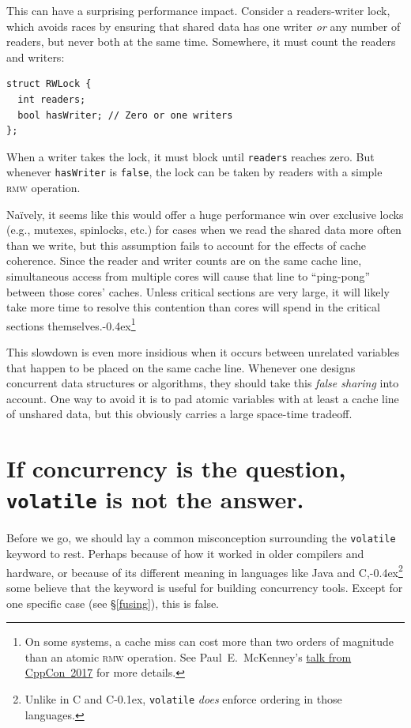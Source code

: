 \documentclass[fontsize=10pt, numbers=endperiod]{scrartcl}
\newcommand{\codesize}{\fontsize{10pt}{12pt}}
\newcommand{\punckern}{\kern-0.4ex}
\newcommand{\monobox}[1]{\mbox{\texttt{#1}}}
\newcommand{\keyword}[1]{\monobox{\color{darkGreen}#1}}
\newcommand{\cpp}[1]{C\kern-0.1ex\raisebox{0.15ex}{\texttt{++}}{\addfontfeature{Numbers=LowercaseOff}#1}}
\newcommand{\clang}[1]{C{\addfontfeature{Numbers=LowercaseOff}#1}}
\newcommand{\csharp}{C\raisebox{0.25ex}{\#}}
\newcommand{\introduce}[1]{\textit{#1}}
\newcommand{\secref}[1]{\hyperref[#1]{\textsc{\S}\ref*{#1}}}
\newenvironment{colfigure}
  {\par\vspace{1\baselineskip minus 0.5\baselineskip}\noindent\minipage{\linewidth}}
  {\endminipage\vspace*{1\baselineskip minus 0.7\baselineskip}}
\begin{document}
\begin{multicols}{2}
This can have a surprising performance impact.
Consider a readers-writer lock,
which avoids races by ensuring that shared data has one writer \emph{or}
any number of readers, but never both at the same time.
Somewhere, it must count the readers and writers:
\begin{colfigure}
\begin{verbatim}
struct RWLock {
  int readers;
  bool hasWriter; // Zero or one writers
};
\end{verbatim}
\end{colfigure}
When a writer takes the lock, it must block until \texttt{readers} reaches zero.
But whenever \texttt{hasWriter} is \texttt{false},
the lock can be taken by readers with a simple \textsc{rmw} operation.

Naïvely, it seems like this would offer a huge performance win over exclusive
locks (e.g., mutexes, spinlocks, etc.) for cases when we read the shared data
more often than we write,
but this assumption fails to account for the effects of cache coherence.
Since the reader and writer counts are on the same cache line,
simultaneous access from multiple cores will cause that line to ``ping-pong''
between those cores' caches.
Unless critical sections are very large, it will likely take more time to
resolve this contention than cores will spend in the critical sections
themselves.\punckern\footnote{On some systems, a cache miss can cost more than
two orders of magnitude than an atomic \textsc{rmw} operation.
See Paul~E.\ McKenney's
\href{https://www.youtube.com/watch?v=74QjNwYAJ7M}{talk from CppCon~2017}
for more details.}

This slowdown is even more insidious when it occurs between unrelated variables
that happen to be placed on the same cache line.
Whenever one designs concurrent data structures or algorithms,
they should take this \introduce{false sharing} into account.
One way to avoid it is to pad atomic variables with at least a cache line of
unshared data, but this obviously carries a large space-time tradeoff.

\section{If concurrency is the question, \texttt{volatile} is not the answer.}

Before we go, we should lay a common misconception surrounding
the \keyword{volatile} keyword to rest.
Perhaps because of how it worked in older compilers and hardware,
or because of its different meaning in languages like
Java and \csharp,\punckern\footnote{Unlike in \clang{} and \cpp{},
\keyword{volatile} \emph{does} enforce ordering in those languages.}
some believe that the keyword is useful for building concurrency tools.
Except for one specific case (see \secref{fusing}), this is false.


\end{multicols}
\end{document}
